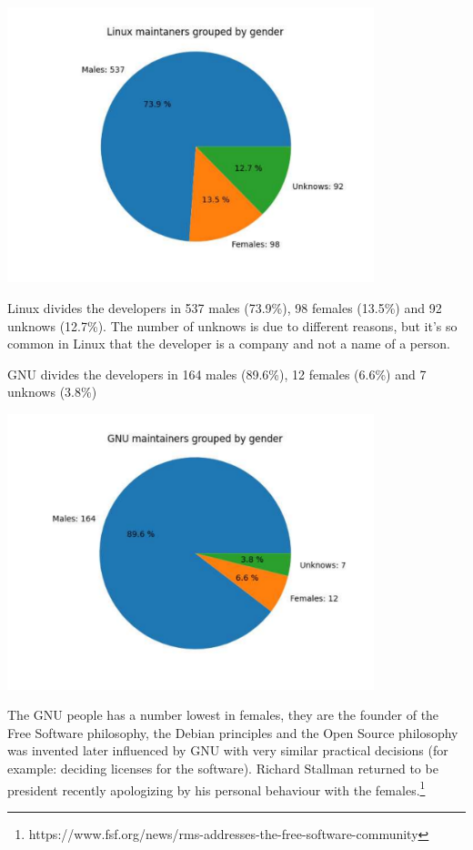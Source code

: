 \documentclass[fleqn,10pt,lineno]{wlpeerj} %
\begin{document}
\includegraphics[width=0.8\textwidth]{images/linux-maintainers.gender.pdf}

Linux divides the developers in 537 males (73.9\%), 98 females
(13.5\%) and 92 unknows (12.7\%). The number of unknows is due to
different reasons, but it's so common in Linux that the developer is a
company and not a name of a person.

GNU divides the developers in 164 males (89.6\%), 12 females (6.6\%)
and 7 unknows (3.8\%)

\includegraphics[width=0.8\textwidth]{images/gnu-maintainers.gender.pdf}

The GNU people has a number lowest in females, they are the founder of
the Free Software philosophy, the Debian principles and the Open
Source philosophy was invented later influenced by GNU with very
similar practical decisions (for example: deciding licenses for the
software). Richard Stallman returned to be president recently
apologizing by his personal behaviour with the
females.\footnote{https://www.fsf.org/news/rms-addresses-the-free-software-community}
\end{document}
